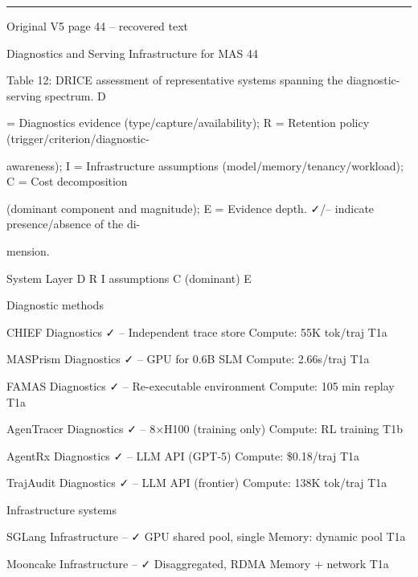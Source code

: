 \par\smallskip\noindent\rule{\textwidth}{0.4pt}\par{\sffamily\footnotesize Original V5 page 44 -- recovered text}\par\begin{flushleft}\footnotesize\ttfamily
\par\smallskip
\par\smallskip
\noindent Diagnostics and Serving Infrastructure for MAS 44\par
\par\smallskip
\par\smallskip
\noindent Table 12: DRICE assessment of representative systems spanning the diagnostic-serving spectrum. D\par
\noindent = Diagnostics evidence (type/capture/availability); R = Retention policy (trigger/criterion/diagnostic-\par
\noindent awareness); I = Infrastructure assumptions (model/memory/tenancy/workload); C = Cost decomposition\par
\noindent (dominant component and magnitude); E = Evidence depth. ✓/– indicate presence/absence of the di-\par
\noindent mension.\par
\par\smallskip
\noindent  System Layer D R I assumptions C (dominant) E\par
\noindent  Diagnostic methods\par
\noindent  CHIEF Diagnostics ✓ – Independent trace store Compute: 55K tok/traj T1a\par
\noindent  MASPrism Diagnostics ✓ – GPU for 0.6B SLM Compute: 2.66s/traj T1a\par
\noindent  FAMAS Diagnostics ✓ – Re-executable environment Compute: 105 min replay T1a\par
\noindent  AgenTracer Diagnostics ✓ – 8×H100 (training only) Compute: RL training T1b\par
\noindent  AgentRx Diagnostics ✓ – LLM API (GPT-5) Compute: \$0.18/traj T1a\par
\noindent  TrajAudit Diagnostics ✓ – LLM API (frontier) Compute: 138K tok/traj T1a\par
\noindent  Infrastructure systems\par
\noindent  SGLang Infrastructure – ✓ GPU shared pool, single Memory: dynamic pool T1a\par
\noindent  Mooncake Infrastructure – ✓ Disaggregated, RDMA Memory + network T1a\par

\end{flushleft}
